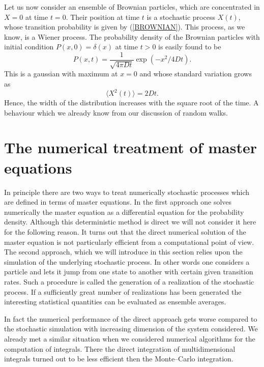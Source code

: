 Let us now consider an ensemble of Brownian particles, which are
concentrated in $X=0$ at time $t=0$. Their position at time $t$ is 
a stochastic process $X(t)$, whose transition probability is given 
by (\ref{BROWNIAN}). This process, as we know, is a Wiener 
process. The probability density of the Brownian particles  with 
initial condition $P(x,0) = \delta(x)$ at time $t>0$ is easily 
found to be
\begin{equation}
P(x,t) = \frac{1}{\sqrt{4 \pi D t}} \exp(-x^2/4Dt).
\end{equation}
This is a gaussian with maximum at $x=0$ and whose standard variation grows
as
\begin{equation}
\langle X^2(t) \rangle = 2 D t.
\end{equation}
Hence, the width of the distribution increases with the square 
root of the time. A behaviour which we already know from our 
discussion of random walks.



\section{The numerical treatment of master equations}
In principle there are two ways to treat numerically
stochastic processes which are defined in terms of master
equations. In the first approach one solves numerically the
master equation as a differential equation for the probability
density. Although this deterministic method is direct we will not consider it 
here for the following reason. It  turns out that the direct 
numerical solution of the master equation is not particularly 
efficient from a computational point of view. The second approach,
which we will introduce in this section relies upon the simulation 
of the underlying stochastic process. In other words one considers 
a particle and lets it jump from one state to another with certain 
given transition rates. Such a procedure is called the generation 
of a realization of the stochastic process. If a sufficiently 
great number of realizations has been generated the interesting 
statistical quantities can be evaluated as ensemble averages.

In fact the numerical performance of the direct approach gets 
worse compared to the stochastic simulation with increasing 
dimension of the system considered. We already met a similar 
situation when we considered numerical algorithms for the 
computation of integrals. There the direct integration of 
multidimensional integrals turned out to be less efficient then 
the Monte--Carlo integration.

